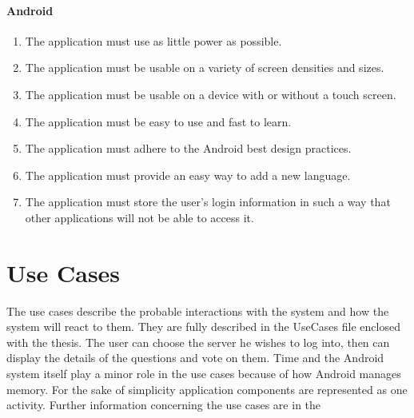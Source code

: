 \documentclass[11pt,twoside,a4paper]{book}
\begin{document}
\paragraph*{Android}
\begin{enumerate}
\item The application must use as little power as possible.
\item The application must be usable on a variety of screen densities and sizes.
\item The application must be usable on a device with or without a touch screen.
\item The application must be easy to use and fast to learn.
\item The application must adhere to the Android best design practices.
\item The application must provide an easy way to add a new language.
\item The application must store the user's login information in such a way that other applications will not be able to access it.
\end{enumerate}
\section{Use Cases}
The use cases describe the probable interactions with the system and how the system will react to them. They are fully described in the UseCases file enclosed with the thesis. The user can choose the server he wishes to log into, then can display the details of the questions and vote on them. Time and the Android system itself play a minor role in the use cases because of how Android manages memory. For the sake of simplicity application components are represented as one activity. Further information concerning the use cases are in the 
\end{document}

